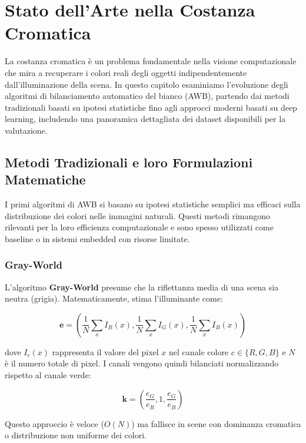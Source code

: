 
\chapter{Stato dell'Arte nella Costanza Cromatica}\label{ch:soa}

La costanza cromatica è un problema fondamentale nella visione computazionale che mira a recuperare i colori reali degli oggetti indipendentemente dall'illuminazione della scena. In questo capitolo esaminiamo l'evoluzione degli algoritmi di bilanciamento automatico del bianco (AWB), partendo dai metodi tradizionali basati su ipotesi statistiche fino agli approcci moderni basati su deep learning, includendo una panoramica dettagliata dei dataset disponibili per la valutazione.

\section{Metodi Tradizionali e loro Formulazioni Matematiche}\label{sec:traditional_methods}

I primi algoritmi di AWB si basano su ipotesi statistiche semplici ma efficaci sulla distribuzione dei colori nelle immagini naturali. Questi metodi rimangono rilevanti per la loro efficienza computazionale e sono spesso utilizzati come baseline o in sistemi embedded con risorse limitate.

\subsection{Gray-World}

L'algoritmo \textbf{Gray-World} \cite{zapryanov_automatic_2012} presume che la riflettanza media di una scena sia neutra (grigia). Matematicamente, stima l'illuminante come:

\begin{equation}
\mathbf{e} = \left( \frac{1}{N} \sum_{x} I_R(x), \frac{1}{N} \sum_{x} I_G(x), \frac{1}{N} \sum_{x} I_B(x) \right)
\label{eq:gray_world}
\end{equation}

dove $I_c(x)$ rappresenta il valore del pixel $x$ nel canale colore $c \in \{R, G, B\}$ e $N$ è il numero totale di pixel. I canali vengono quindi bilanciati normalizzando rispetto al canale verde:

\begin{equation}
\mathbf{k} = \left( \frac{e_G}{e_R}, 1, \frac{e_G}{e_B} \right)
\end{equation}

Questo approccio è veloce ($O(N)$) ma fallisce in scene con dominanza cromatica o distribuzione non uniforme dei colori.

